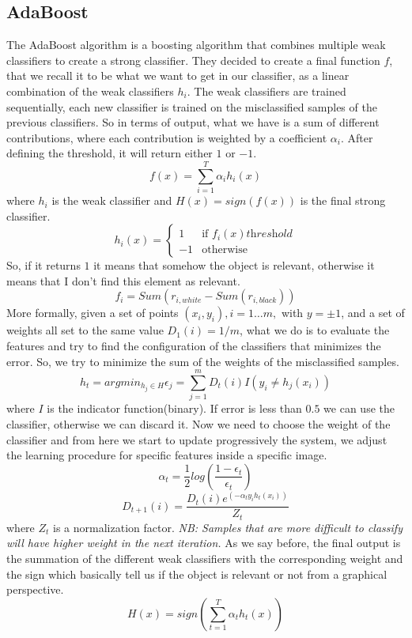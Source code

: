\subsection{AdaBoost}
The AdaBoost algorithm is a boosting algorithm that combines multiple weak classifiers to create a strong classifier.
They decided to create a final function $f$, that we recall it to be what we want to get in our classifier, as a linear combination of the weak classifiers $h_i$.
The weak classifiers are trained sequentially, each new classifier is trained on the misclassified samples of the previous classifiers.
So in terms of output, what we have is a sum of different contributions, where each contribution is weighted by a coefficient $\alpha_i$.
After defining the threshold, it will return either $1$ or $-1$.
\[
f(x)=\sum_{i=1}^{T}\alpha_ih_i(x)    
\]
where $h_i$ is the weak classifier and $H(x)=sign(f(x))$ is the final strong classifier.
\[h_i(x)=\begin{cases}
    1 & \text{if } f_i(x) \textit{threshold} \\
    -1 & \text{otherwise}
\end{cases}\]
So, if it returns $1$ it means that somehow the object is relevant, otherwise it means that I don't find this element as relevant.
\[f_i = Sum(r_{i, white}-Sum(r_{i, black}))\]
More formally, given a set of points $(x_i,y_i), i=1\dots m,$ with $y = \pm1$, and a set of weights all set to the same value $D_1(i)=1/m$, what we do is to evaluate the features and try to find the configuration of the classifiers that minimizes the error.
So, we try to minimize the sum of the weights of the misclassified samples.
\[h_t = argmin_{h_j \in H} {\epsilon_j}=\sum_{j=1}^{m}D_t(i)I(y_i \neq h_j(x_i))\]
where $I$ is the indicator function(binary).
If error is less than $0.5$ we can use the classifier, otherwise we can discard it.
Now we need to choose the weight of the classifier and from here we start to update progressively the system, we adjust the learning procedure for specific features inside a specific image.
\[\alpha_t = \frac{1}{2}log(\frac{1-\epsilon_t}{\epsilon_t})\]
\[D_{t+1}(i) = \frac{D_t(i)e^{(-\alpha_ty_ih_t(x_i))}}{Z_t}\]
where $Z_t$ is a normalization factor.
\textit{NB: Samples that are more difficult to classify will have higher weight in the next iteration.}
As we say before, the final output is the summation of the different weak classifiers with the corresponding weight and the sign which basically tell us if the object is relevant or not from a graphical perspective.
\[
H(x)=\textit{sign}(\sum_{t=1}^{T}\alpha_th_t(x))
\]
